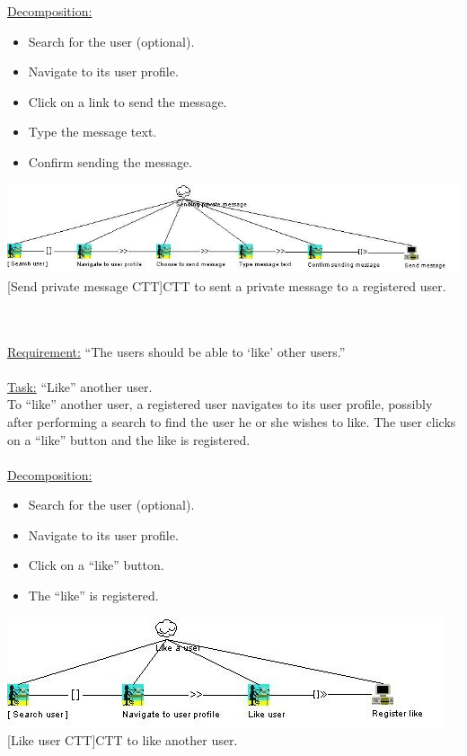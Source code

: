 \documentclass[11pt, a4paper,svglistings,oneside]{book}
\begin{document}
\underline{Decomposition:}
\begin{itemize}
\item Search for the user (optional).
\item Navigate to its user profile.
\item Click on a link to send the message.
\item Type the message text.
\item Confirm sending the message.
\end{itemize}
\noindent\begin{minipage}{\textwidth}
    \centering
   \includegraphics[width=\textwidth]{CTT_Send_PM.png}
 [Send private message CTT]{CTT to sent a private message to a registered user.}
\end{minipage}
$\;$ \\ \\
\underline{Requirement:} ``The users should be able to `like' other users.'' \\ \\
\underline{Task:} ``Like'' another user. \\
To ``like'' another user, a registered user navigates to its user profile, possibly after performing a search to find the user he or she wishes to like. The user clicks on a ``like'' button and the like is registered. \\ \\
\underline{Decomposition:}
\begin{itemize}
\item Search for the user (optional).
\item Navigate to its user profile.
\item Click on a ``like'' button.
\item The ``like'' is registered.
\end{itemize}
\noindent\begin{minipage}{\textwidth}
    \centering
   \includegraphics[width=\textwidth]{CTT_Like.png}
 [Like user CTT]{CTT to like another user.}
\end{minipage}
\end{document}
